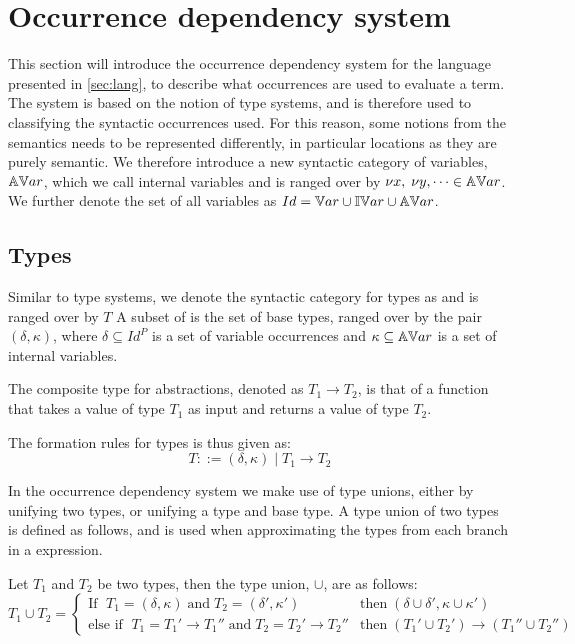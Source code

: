 \documentclass[../../master.tex]{subfiles}
\begin{document}
\section{Occurrence dependency system}
This section will introduce the occurrence dependency system for the language presented in \cref{sec:lang}, to describe what occurrences are used to evaluate a term.
The system is based on the notion of type systems, and is therefore used to classifying the syntactic occurrences used.
For this reason, some notions from the semantics needs to be represented differently, in particular locations as they are purely semantic.
We therefore introduce a new syntactic category of variables, $\mathbb{AV}ar$, which we call internal variables and is ranged over by $\nu x,\;\nu y,\cdots\in\mathbb{AV}ar$.
We further denote the set of all variables as $Id=\mathbb{V}ar\cup\mathbb{IV}ar\cup\mathbb{AV}ar$.

\subsection{Types}
Similar to type systems, we denote the syntactic category for types as  and is ranged over by $T$
A subset of  is the set of base types, ranged over by the pair $(\delta,\kappa)$, where $\delta\subseteq Id^P$ is a set of variable occurrences and $\kappa\subseteq\mathbb{AV}ar$ is a set of internal variables.

The composite type for abstractions, denoted as $T_1\rightarrow T_2$, is that of a function that takes a value of type $T_1$ as input and returns a value of type $T_2$.

The formation rules for types is thus given as:
$$T::=(\delta,\kappa)\mid T_1 \rightarrow T_2$$

In the occurrence dependency system we make use of type unions, either by unifying two types, or unifying a type and base type.
A type union of two types is defined as follows, and is used when approximating the types from each branch in a  expression.
\begin{definition}
	Let $T_1$ and $T_2$ be two types, then the type union, $\cup$, are as follows:
	\begin{equation*}
		T_1\cup T_2=
		\left\{\begin{matrix}
			\mbox{If } \; T_1=(\delta,\kappa) \;\mbox{and}\; T_2=(\delta',\kappa')  & \mbox{then} \; (\delta\cup\delta',\kappa\cup\kappa')\\
			\mbox{else if } \; T_1=T_1'\rightarrow T_1''\;\mbox{and}\;T_2=T_2'\rightarrow T_2'' & \mbox{then} \; (T_1'\cup T_2')\rightarrow (T_1''\cup T_2'')
		\end{matrix}\right.
	\end{equation*}
\end{definition}
\end{document}
